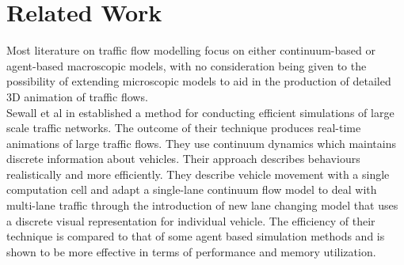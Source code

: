 \section*{Related Work}
\par{}
Most literature on traffic flow modelling focus on either continuum-based or agent-based macroscopic models, with no consideration being given to the possibility of extending microscopic models to aid in the production of detailed 3D  animation of traffic flows. \\
Sewall et al in \cite{Sewall} established a method for conducting efficient simulations of large scale traffic networks. The outcome of their technique produces real-time animations of large traffic flows.
They use continuum dynamics which maintains discrete information about vehicles. Their approach describes behaviours realistically and more efficiently. They describe vehicle movement with a single computation cell  and adapt a single-lane continuum flow model to deal with multi-lane traffic through the introduction of new lane changing model that uses a discrete visual representation for individual vehicle.
The efficiency of their technique is compared to that of some agent based simulation methods and is shown to be more effective in terms of performance and memory utilization.